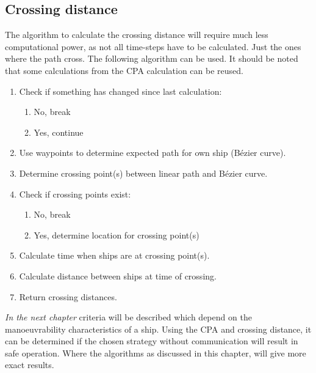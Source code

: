 \subsection{Crossing distance}
The algorithm to calculate the crossing distance will require much less computational power, as not all time-steps have to be calculated. Just the ones where the path cross. The following algorithm can be used. It should be noted that some calculations from the CPA calculation can be reused.
\begin{enumerate}
	\item Check if something has changed since last calculation:
	\begin{enumerate}
		\item No, break
		\item Yes, continue
	\end{enumerate}
	\item Use waypoints to determine expected path for own ship (Bézier curve).
	\item Determine crossing point(s) between linear path and Bézier curve.
	\item Check if crossing points exist:
	\begin{enumerate}
		\item No, break
		\item Yes, determine location for crossing point(s)
	\end{enumerate}
	\item Calculate time when ships are at crossing point(s).
	\item Calculate distance between ships at time of crossing.
	\item Return crossing distances.
\end{enumerate}

\vspace{1.5cm}
\emph{In the next chapter} criteria will be described which depend on the manoeuvrability characteristics of a ship. Using the \ac{CPA} and crossing distance, it can be determined if the chosen strategy without communication will result in safe operation. Where the algorithms as discussed in this chapter, will give more exact results.













